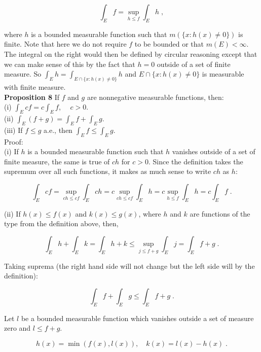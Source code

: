 \documentclass[a4paper]{article}
\begin{document}
$$\int_E f = \sup_{h \leq f} \int_E h \;,$$

where $h$ is a bounded measurable function such that $m(\{x : h(x) \neq 0\})$ is finite. Note that here we do not require $f$ to be bounded or that $m(E) < \infty$. The integral on the right would then be defined by circular reasoning except that we can make sense of this by the fact that $h = 0 $ outside of a set of finite measure. So $\int_{E} h = \int_{E \cap \{x : h(x) \neq 0\}} h$ and $E \cap \{x : h(x) \neq 0\}$ is measurable with finite measure. \\

{\bf Proposition 8} If $f$ and $g$ are nonnegative measurable functions, then:\\

(i)  $\int_E cf = c\int_E f$, $\quad c>0$. \\

(ii) $\int_E (f+g) = \int_E f + \int_E g$.\\

(iii) If $f \leq g$ a.e., then $\int_E f \leq \int_E g$. \\

Proof: \\

(i) If $h$ is a bounded measurable function such that $h$ vanishes outside of a set of finite measure, the same is true of $ch$ for $c >0$. Since the definition takes the supremum over all such functions, it makes as much sense to write $ch$ as $h$:

$$ \int_E cf = \sup_{ch\leq cf} \int_E ch = c\sup_{ch \leq cf} \int_E h  = c \sup_{h \leq f} \int_E h = c\int_E f \;.$$

(ii) If $h(x) \leq f(x)$ and $k(x) \leq g(x)$, where $h$ and $k$ are functions of the type from the definition above, then,

$$\int_{E} h + \int_E k = \int_E h + k \leq \sup_{j \leq f+g} \int_E j = \int_E f+g \;.$$

Taking suprema (the right hand side will not change but the left side will by the definition):

$$\int_E f + \int_E g \leq \int_E f+g \;.$$

Let $l$ be a bounded measurable function which vanishes outside a set of measure zero and $l \leq f+g$. 

$$h(x) = \min (f(x) , l(x)), \quad k(x) = l(x) - h(x) \;.$$
\end{document}
